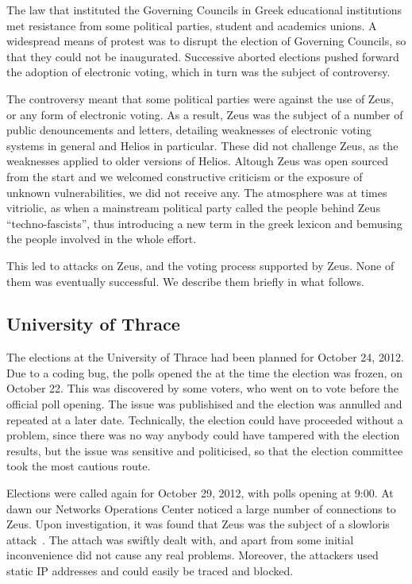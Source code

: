 \documentclass[letterpaper,10pt]{article}
\begin{document}
The law that instituted the Governing Councils in Greek educational
institutions met resistance from some political parties, student and
academics unions. A widespread means of protest was to disrupt the
election of Governing Councils, so that they could not be inaugurated.
Successive aborted elections pushed forward the adoption of electronic
voting, which in turn was the subject of controversy. 

The controversy meant that some political parties were against the use
of Zeus, or any form of electronic voting. As a result, Zeus was the
subject of a number of public denouncements and letters, detailing
weaknesses of electronic voting systems in general and Helios in
particular. These did not challenge Zeus, as the weaknesses applied to
older versions of Helios. Altough Zeus was open sourced from the start
and we welcomed constructive criticism or the exposure of unknown
vulnerabilities, we did not receive any. The atmosphere was at times
vitriolic, as when a mainstream political party called the people
behind Zeus ``techno-fascists'', thus introducing a new term in the
greek lexicon and bemusing the people involved in the whole effort.

This led to attacks on Zeus, and the voting process supported by Zeus.
None of them was eventually successful. We describe them briefly in
what follows.

\subsection{University of Thrace}

The elections at the University of Thrace had been planned for October
24, 2012. Due to a coding bug, the polls opened the at the time the
election was frozen, on October 22. This was discovered by some
voters, who went on to vote before the official poll opening. The
issue was publishised and the election was annulled and repeated at a
later date. Technically, the election could have proceeded without a
problem, since there was no way anybody could have tampered with the
election results, but the issue was sensitive and politicised, so that
the election committee took the most cautious route.

Elections were called again for October 29, 2012, with polls opening
at 9:00. At dawn our Networks Operations Center noticed a large number
of connections to Zeus. Upon investigation, it was found that Zeus was
the subject of a slowloris attack~\cite{slowloris}. The attach was
swiftly dealt with, and apart from some initial inconvenience did not
cause any real problems. Moreover, the attackers used static IP
addresses and could easily be traced and blocked.
\end{document}
